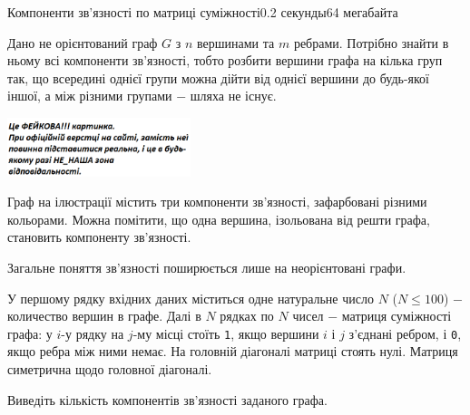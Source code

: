 \begin{problem}{Компоненти зв'язності по матриці суміжності}{}{}{0.2 секунды}{64 мегабайта}


Дано не орієнтований граф $G$ з $n$ вершинами та $m$ ребрами. Потрібно знайти в ньому всі компоненти зв'язності, 
тобто розбити вершини графа на кілька груп так, що всередині однієї групи можна дійти від однієї вершини до будь-якої іншої,
а між різними групами $-$ шляха не існує.

  \begin{center}
    \includegraphics[width=0.40\textwidth,natwidth=232,natheight=217]{pic.png}
  \end{center}

Граф на ілюстрації містить три компоненти зв'язності, зафарбовані різними кольорами.
Можна помітити, що одна вершина, ізольована від решти графа, становить компоненту зв'язності.


Загальне поняття зв'язності поширюється лише на неорієнтовані графи.

\InputFile
У першому рядку вхідних даних міститься одне натуральне число $N$ ($N \leqslant 100$) $-$ количество вершин в графе.
Далі в $N$ рядках по $N$ чисел $-$ матриця суміжності графа: у $i$-у рядку на $j$-му місці стоїть \texttt{1}, якщо вершини $i$ і $j$ 
з'єднані ребром, і \texttt{0}, якщо ребра між ними немає. 
На головній діагоналі матриці стоять нулі. Матриця симетрична щодо головної діагоналі.

\OutputFile
Виведіть кількість компонентів зв'язності заданого графа.


\Example
\begin{example}
%
\end{example}

\end{problem}
